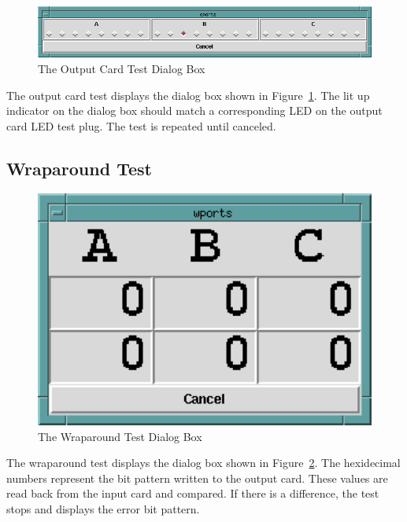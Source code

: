 \begin{figure}[hbpt]
\begin{centering}
\includegraphics[width=5in]{UTOutputTest.png}
\caption{The Output Card Test Dialog Box}
\label{fig:ut:outtest}
\end{centering}
\end{figure}
The output card test displays the dialog box shown in
Figure~\ref{fig:ut:outtest}.  The lit up indicator on the dialog box
should match a corresponding LED on the output card LED test plug. The
test is repeated until canceled.

\subsection{Wraparound Test}

\begin{figure}[hbpt]
\begin{centering}
\includegraphics[width=5in]{UTWrapAround.png}
\caption{The Wraparound Test Dialog Box}
\label{fig:ut:wraptest}
\end{centering}
\end{figure}
The wraparound test displays the dialog box shown in
Figure~\ref{fig:ut:wraptest}.  The hexidecimal numbers represent the bit
pattern written to the output card.  These values are read back from the
input card and compared.  If there is a difference, the test stops and
displays the error bit pattern.

